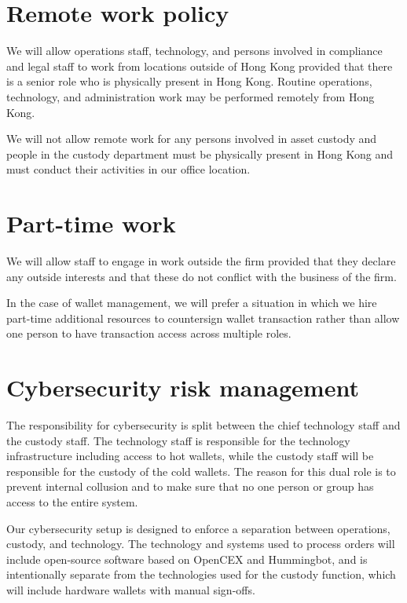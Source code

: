 \section{Remote work policy}
We will allow operations staff, technology, and persons involved in
compliance and legal staff to work from locations outside of Hong Kong
provided that there is a senior role who is physically present in Hong
Kong.  Routine operations, technology, and administration work may be
performed remotely from Hong Kong.

We will not allow remote work for any persons involved in asset
custody and people in the custody department must be physically
present in Hong Kong and must conduct their activities in our office
location.

\section{Part-time work}
We will allow staff to engage in work outside the firm provided
that they declare any outside interests and that these do not conflict
with the business of the firm.

In the case of wallet management, we will prefer a situation in which we
hire part-time additional resources to countersign wallet transaction
rather than allow one person to have transaction access across
multiple roles.

\section{Cybersecurity risk management}

The responsibility for cybersecurity is split between the chief
technology staff and the custody staff.  The technology staff is
responsible for the technology infrastructure including access to hot
wallets, while the custody staff will be responsible for the custody
of the cold wallets.  The reason for this dual role is to prevent
internal collusion and to make sure that no one person or group has
access to the entire system.

Our cybersecurity setup is designed to enforce a separation between
operations, custody, and technology.  The technology and systems used
to process orders will include open-source software based on OpenCEX
and Hummingbot, and is intentionally separate from the technologies
used for the custody function, which will include hardware wallets with
manual sign-offs.

